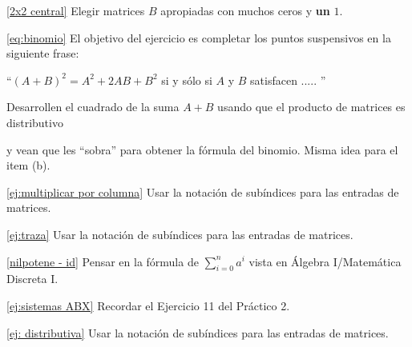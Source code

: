 \documentclass[12pt]{amsart}
\begin{document}
\medskip

\eqref{2x2 central} Elegir matrices $B$ apropiadas con muchos ceros y \textbf{un} $1$.

\medskip

\eqref{eq:binomio} El objetivo del ejercicio es completar los puntos suspensivos en la siguiente frase:


``$(A+B)^2=A^2+2AB+B^2$ si y s\'olo si $A$ y $B$ satisfacen ..... ''

Desarrollen el cuadrado de la suma $A+B$ usando que el producto de matrices es distributivo

y vean que les ``sobra'' para obtener la f\'ormula del binomio.  Misma idea para el item (b).

\medskip

\eqref{ej:multiplicar por columna} Usar la notaci\'on de sub\'indices para las entradas de matrices.

\medskip

\eqref{ej:traza} Usar la notaci\'on de sub\'indices para las entradas de matrices.

\medskip

\eqref{nilpotene - id} Pensar en la f\'ormula de $\sum_{i=0}^na^i$ vista en \'Algebra I/Matem\'atica Discreta I.

\medskip

\eqref{ej:sistemas ABX} Recordar el Ejercicio 11 del Pr\'actico 2.

\medskip

\eqref{ej: distributiva} Usar la notaci\'on de sub\'indices para las entradas de matrices.
\end{document}
